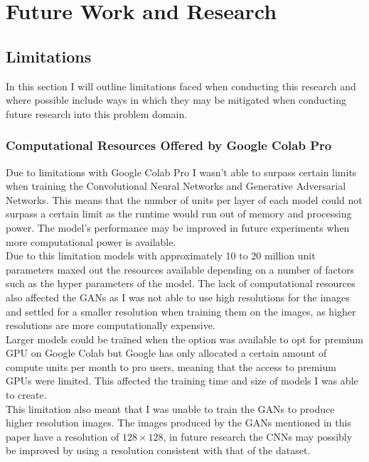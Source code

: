 \chapter{Future Work and Research}
\section{Limitations}
In this section I will outline limitations faced when conducting this research and where possible include ways in which they may be mitigated when conducting future research into this problem domain.
\subsection{Computational Resources Offered by Google Colab Pro}
Due to limitations with Google Colab Pro I wasn't able to surpass certain limits when training the Convolutional Neural Networks and Generative Adversarial Networks.  This means that the number of units per layer of each model could not surpass a certain limit as the runtime would run out of memory and processing power.  The model's performance may be improved in future experiments when more computational power is available.   
\\
Due to this limitation models with approximately 10 to 20 million unit parameters maxed out the resources available depending on a number of factors such as the hyper parameters of the model.  The lack of computational resources also affected the GANs as I was not able to use high resolutions for the images and settled for a smaller resolution when training them on the images, as higher resolutions are more computationally expensive.
\\
Larger models could be trained when the option was available to opt for premium GPU on Google Colab but Google has only allocated a certain amount of compute units per month to pro users, meaning that the access to premium GPUs were limited.  This affected the training time and size of models I was able to create.
\\
This limitation also meant that I was unable to train the GANs to produce higher resolution images.  The images produced by the GANs mentioned in this paper have a resolution of $128\times128$, in future research the CNNs may possibly be improved by using a resolution consistent with that of the dataset.
